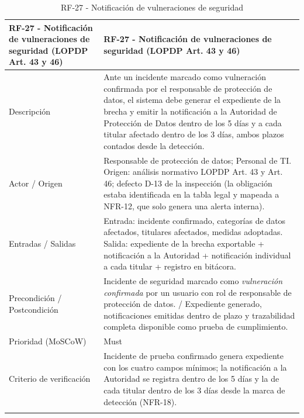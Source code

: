 \begingroup
\small
\begin{longtable}{|p{7.8cm}|p{7.8cm}|}
\hline
RF-27 - Notificaci\'on de vulneraciones de seguridad (LOPDP Art. 43 y 46) & RF-27 - Notificaci\'on de vulneraciones de seguridad (LOPDP Art. 43 y 46) \\ \hline
Descripci\'on & Ante un incidente marcado como vulneraci\'on confirmada por el responsable de protecci\'on de datos, el sistema debe generar el expediente de la brecha y emitir la notificaci\'on a la Autoridad de Protecci\'on de Datos dentro de los 5 d\'ias y a cada titular afectado dentro de los 3 d\'ias, ambos plazos contados desde la detecci\'on. \\ \hline
Actor / Origen & Responsable de protecci\'on de datos; Personal de TI. Origen: an\'alisis normativo LOPDP Art. 43 y Art. 46; defecto D-13 de la inspecci\'on (la obligaci\'on estaba identificada en la tabla legal y mapeada a NFR-12, que solo genera una alerta interna). \\ \hline
Entradas / Salidas & Entrada: incidente confirmado, categor\'ias de datos afectados, titulares afectados, medidas adoptadas. Salida: expediente de la brecha exportable + notificaci\'on a la Autoridad + notificaci\'on individual a cada titular + registro en bit\'acora. \\ \hline
Precondici\'on / Postcondici\'on & Incidente de seguridad marcado como \emph{vulneraci\'on confirmada} por un usuario con rol de responsable de protecci\'on de datos. / Expediente generado, notificaciones emitidas dentro de plazo y trazabilidad completa disponible como prueba de cumplimiento. \\ \hline
Prioridad (MoSCoW) & Must \\ \hline
Criterio de verificaci\'on & Incidente de prueba confirmado genera expediente con los cuatro campos m\'inimos; la notificaci\'on a la Autoridad se registra dentro de los 5 d\'ias y la de cada titular dentro de los 3 d\'ias desde la marca de detecci\'on (NFR-18). \\ \hline
\caption{RF-27 - Notificaci\'on de vulneraciones de seguridad}
\end{longtable}
\endgroup

